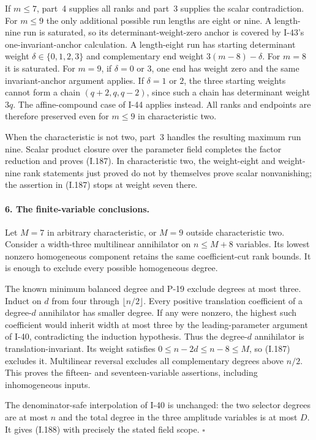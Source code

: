 If $m\le7$, part~4 supplies all ranks and part~3 supplies
the scalar contradiction. For $m\le9$ the only additional
possible run lengths are eight or nine. A length-nine run
is saturated, so its determinant-weight-zero anchor is
covered by I-43's one-invariant-anchor calculation. A
length-eight run has starting determinant weight
$\delta\in\{0,1,2,3\}$ and complementary end weight
$3(m-8)-\delta$. For $m=8$ it is saturated. For $m=9$,
if $\delta=0$ or $3$, one end has weight zero and the same
invariant-anchor argument applies. If $\delta=1$ or $2$,
the three starting weights cannot form a chain
$(q+2,q,q-2)$, since such a chain has determinant weight
$3q$. The affine-compound case of I-44 applies instead.
All ranks and endpoints are therefore preserved even for
$m\le9$ in characteristic two.

When the characteristic is not two, part~3 handles the
resulting maximum run nine. Scalar product closure over
the parameter field completes the factor reduction and
proves (I.187). In characteristic two, the weight-eight
and weight-nine rank statements just proved do not by
themselves prove scalar nonvanishing; the assertion in
(I.187) stops at weight seven there.

\paragraph{6. The finite-variable conclusions.}
Let $M=7$ in arbitrary characteristic, or $M=9$ outside
characteristic two. Consider a width-three multilinear
annihilator on $n\le M+8$ variables. Its lowest nonzero
homogeneous component retains the same coefficient-cut
rank bounds. It is enough to exclude every possible
homogeneous degree.

The known minimum balanced degree and P-19 exclude degrees
at most three. Induct on $d$ from four through
$\lfloor n/2\rfloor$. Every positive translation
coefficient of a degree-$d$ annihilator has smaller degree.
If any were nonzero, the highest such coefficient would
inherit width at most three by the leading-parameter
argument of I-40, contradicting the induction hypothesis.
Thus the degree-$d$ annihilator is translation-invariant.
Its weight satisfies
$0\le n-2d\le n-8\le M$, so (I.187) excludes it.
Multilinear reversal excludes all complementary degrees
above $n/2$. This proves the fifteen- and seventeen-variable
assertions, including inhomogeneous inputs.

The denominator-safe interpolation of I-40 is unchanged:
the two selector degrees are at most $n$ and the total
degree in the three amplitude variables is at most $D$.
It gives (I.188) with precisely the stated field scope.
\hfill$\square$


